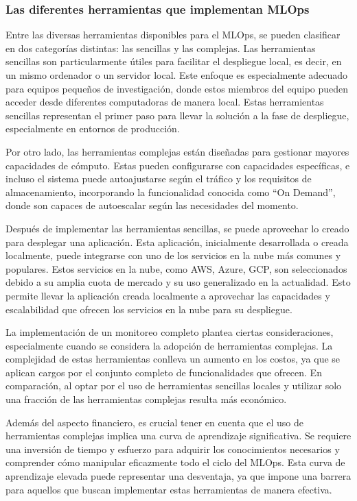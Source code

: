 \subsubsection{Las diferentes herramientas que implementan MLOps}

Entre las diversas herramientas disponibles para el MLOps, se pueden clasificar en dos categorías distintas: las sencillas y las complejas. Las herramientas sencillas son particularmente útiles para facilitar el despliegue local, es decir, en un mismo ordenador o un servidor local. Este enfoque es especialmente adecuado para equipos pequeños de investigación, donde estos miembros del equipo pueden acceder desde diferentes computadoras de manera local. Estas herramientas sencillas representan el primer paso para llevar la solución a la fase de despliegue, especialmente en entornos de producción.

Por otro lado, las herramientas complejas están diseñadas para gestionar mayores capacidades de cómputo. Estas pueden configurarse con capacidades específicas, e incluso el sistema puede autoajustarse según el tráfico y los requisitos de almacenamiento, incorporando la funcionalidad conocida como ``On Demand'', donde son capaces de autoescalar según las necesidades del momento. 

Después de implementar las herramientas sencillas, se puede aprovechar lo creado para desplegar una aplicación. Esta aplicación, inicialmente desarrollada o creada localmente, puede integrarse con uno de los servicios en la nube más comunes y populares. Estos servicios en la nube, como AWS, Azure, GCP, son seleccionados debido a su amplia cuota de mercado y su uso generalizado en la actualidad. Esto permite llevar la aplicación creada localmente a aprovechar las capacidades y escalabilidad que ofrecen los servicios en la nube para su despliegue.

\newpage

La implementación de un monitoreo completo plantea ciertas consideraciones, especialmente cuando se considera la adopción de herramientas complejas. La complejidad de estas herramientas conlleva un aumento en los costos, ya que se aplican cargos por el conjunto completo de funcionalidades que ofrecen. En comparación, al optar por el uso de herramientas sencillas locales y utilizar solo una fracción de las herramientas complejas resulta más económico.

Además del aspecto financiero, es crucial tener en cuenta que el uso de herramientas complejas implica una curva de aprendizaje significativa. Se requiere una inversión de tiempo y esfuerzo para adquirir los conocimientos necesarios y comprender cómo manipular eficazmente todo el ciclo del MLOps. Esta curva de aprendizaje elevada puede representar una desventaja, ya que impone una barrera para aquellos que buscan implementar estas herramientas de manera efectiva.


